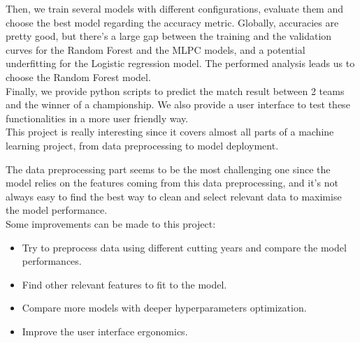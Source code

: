 \documentclass[a4paper,12pt]{article}
\begin{document}
Then, we train several models with different configurations, evaluate them and choose the best model regarding the accuracy metric. Globally, accuracies are pretty good, but there's a large gap between the training and the validation curves for the Random Forest and the MLPC models, and a potential underfitting for the Logistic regression model. The performed analysis leads us to choose the Random Forest model.\\

Finally, we provide python scripts to predict the match result between 2 teams and the winner of a championship. We also provide a user interface to test these functionalities in a more user friendly way.\\


This project is really interesting since it covers almost all parts of a machine learning project, from data preprocessing to model deployment. 

The data preprocessing part seems to be the most challenging one since the model relies on the features coming from this data preprocessing, and it's not always easy to find the best way to clean and select relevant data to maximise the model performance. \\

Some improvements can be made to this project:
\begin{itemize}
    \item Try to preprocess data using different cutting years and compare the model performances.
    \item Find other relevant features to fit to the model.
    \item Compare more models with deeper hyperparameters optimization.
    \item Improve the user interface ergonomics.
\end{itemize}
\end{document}
